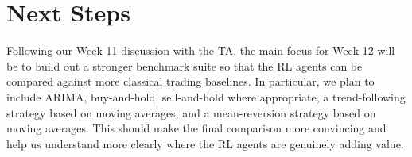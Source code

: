 \documentclass[11pt,twocolumn]{article}
\begin{document}
\section{Next Steps}

Following our Week 11 discussion with the TA, the main focus for Week 12 will be to build out a stronger benchmark suite so that the RL agents can be compared against more classical trading baselines. In particular, we plan to include ARIMA, buy-and-hold, sell-and-hold where appropriate, a trend-following strategy based on moving averages, and a mean-reversion strategy based on moving averages. This should make the final comparison more convincing and help us understand more clearly where the RL agents are genuinely adding value.
\end{document}
